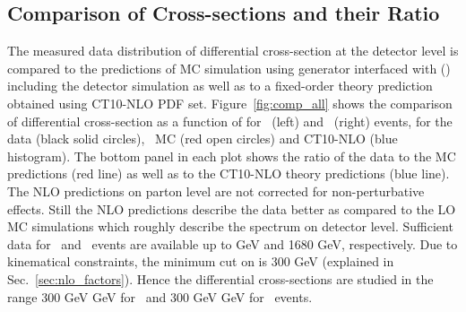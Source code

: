 \subsection{Comparison of Cross-sections and their Ratio}
\label{Sec:comp}
The measured data distribution of differential cross-section at the detector level is compared to the predictions of MC simulation using \MadGraphF generator interfaced with \PYTHIAS (\MGP) including the detector simulation as well as to a fixed-order theory prediction obtained using CT10-NLO PDF set. Figure~\ref{fig:comp_all} shows the comparison of differential cross-section as a function of \httwo for \njt~(left) and \njth~(right) events, for the data (black solid circles), \MGP~MC (red open circles) and CT10-NLO (blue histogram). The bottom panel in each plot shows the ratio of the data to the MC predictions (red line) as well as to the CT10-NLO theory predictions (blue line). The NLO predictions on parton level are not corrected for non-perturbative effects. Still the NLO predictions describe the data better as compared to the LO MC simulations which roughly describe the spectrum on detector level. Sufficient data for \njt~and \njth~events are available up to \httwo {} GeV and 1680 GeV, respectively. Due to kinematical constraints, the minimum cut on \httwo is 300 GeV (explained in Sec.~\ref{sec:nlo_factors}). Hence the differential cross-sections are studied in the range 300 GeV \ls \httwo {} GeV for \njt~and 300 GeV \ls \httwo {} GeV for \njth~events.

